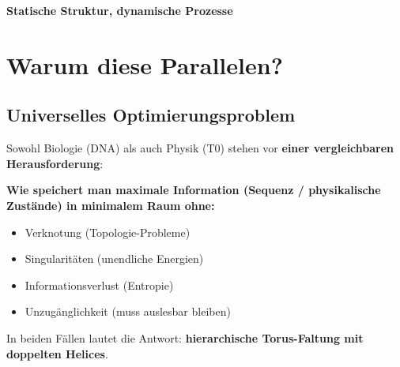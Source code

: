 		\textbf{Statische Struktur, dynamische Prozesse}

		\vspace{0.3cm}

		\begin{center}
		\end{center}


	\section{Warum diese Parallelen?}

	\subsection{Universelles Optimierungsproblem}

	\begin{philosophical}
		Sowohl Biologie (DNA) als auch Physik (T0) stehen vor \textbf{einer vergleichbaren Herausforderung}:

		\vspace{0.3cm}

		\textbf{Wie speichert man maximale Information (Sequenz / physikalische Zustände) in minimalem Raum ohne:}
		\begin{itemize}
			\item Verknotung (Topologie-Probleme)
			\item Singularitäten (unendliche Energien)
			\item Informationsverlust (Entropie)
			\item Unzugänglichkeit (muss auslesbar bleiben)
		\end{itemize}

		\vspace{0.3cm}

		In beiden Fällen lautet die Antwort: \textbf{hierarchische Torus-Faltung mit doppelten Helices}.
	\end{philosophical}

